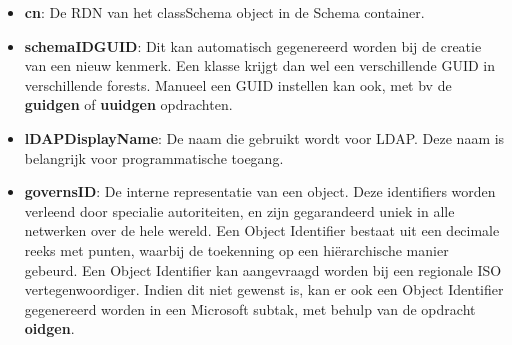 \begin{enumerate}
		 { 
			\begin{itemize}
				\item \textbf{cn}: De RDN van het classSchema object in de Schema container.
				\item \textbf{schemaIDGUID}: Dit kan automatisch gegenereerd worden bij de creatie van een nieuw kenmerk. Een klasse krijgt dan wel een verschillende GUID in verschillende forests. Manueel een GUID instellen kan ook, met bv de \textbf{guidgen} of \textbf{uuidgen} opdrachten.
				\item \textbf{lDAPDisplayName}: De naam die gebruikt wordt voor LDAP. Deze naam is belangrijk voor programmatische toegang.
				\item \textbf{governsID}: De interne representatie van een object. Deze identifiers worden verleend door specialie autoriteiten, en zijn gegarandeerd uniek in alle netwerken over de hele wereld. Een Object Identifier bestaat uit een decimale reeks met punten, waarbij de toekenning op een hiërarchische manier gebeurd. Een Object Identifier kan aangevraagd worden bij een regionale ISO vertegenwoordiger. Indien dit niet gewenst is, kan er ook een Object Identifier gegenereerd worden in een Microsoft subtak, met behulp van de opdracht \textbf{oidgen}.
			\end{itemize}
		}
		

\end{enumerate}
